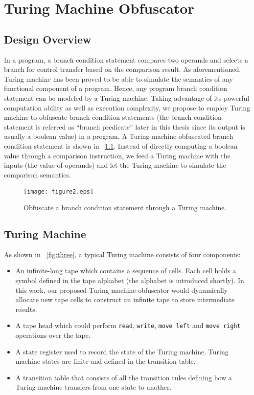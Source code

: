 \chapter{Turing Machine Obfuscator}

%
\section{Design Overview}
In a program, a branch condition statement compares two operands and selects a
branch for control transfer based on the comparison result. As aforementioned,
Turing machine has been proved to be able to simulate the semantics of any
functional component of a program. Hence, any program branch condition statement
can be modeled by a Turing machine. Taking advantage of its powerful computation
ability as well as execution complexity, we propose to employ Turing machine to
obfuscate branch condition statements (the branch condition statement is
referred as ``branch predicate'' later in this thesis since its output is usually
a boolean value) in a program. A Turing machine obfuscated branch condition
statement is shown in \F~\ref{fig:two}. Instead of directly computing a boolean
value through a comparison instruction, we feed a Turing machine with the inputs
(the value of operands) and let the Turing machine to simulate the comparison
semantics.

\begin{figure}
 \texttt{[image: figure2.eps]}
 \caption{Obfuscate a branch condition statement through a Turing machine.}
 \label{fig:two}
\end{figure}

\section{Turing Machine}
As shown in \F~\ref{fig:three}, a typical Turing machine consists of four
components:
\begin{itemize}
  \item An infinite-long tape which contains a sequence of cells. Each cell
    holds a symbol defined in the tape alphabet (the alphabet is introduced
    shortly). In this work, our proposed Turing machine obfuscator would
    dynamically allocate new tape cells to construct an infinite tape to store
    intermediate results.
  \item A tape head which could perform \texttt{read}, \texttt{write},
    \texttt{move left} and \texttt{move right} operations over the tape.
  \item A state register used to record the state of the Turing machine. Turing
    machine states are finite and defined in the transition table.
  \item A transition table that consists of all the transition rules defining
    how a Turing machine transfers from one state to another.
\end{itemize}

